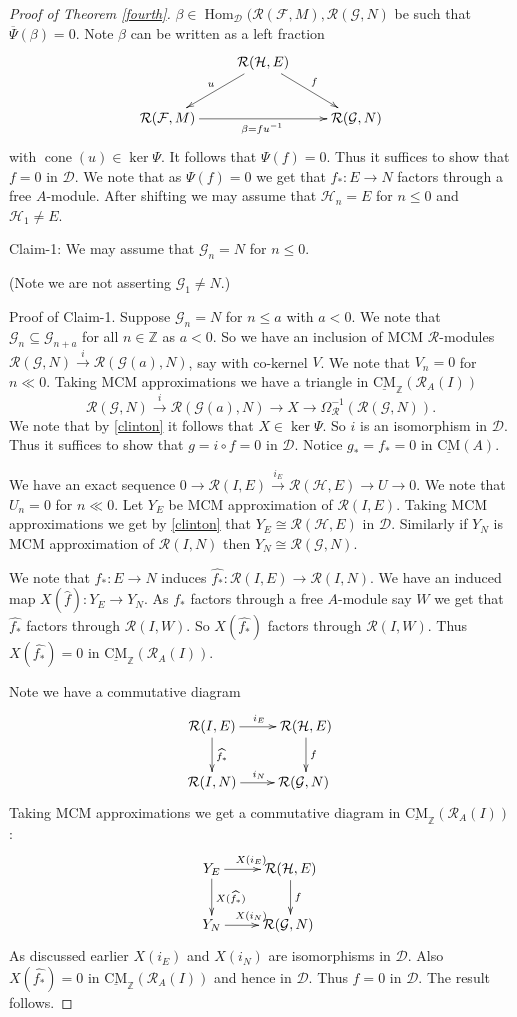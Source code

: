 \documentclass{amsart}
\newcommand{\D}{\mathcal{D} }
\newcommand{\Z}{\mathbb{Z} }
\newcommand{\eR}{\mathcal{R} }
\newcommand{\Fc}{\mathcal{F} }
\newcommand{\Hc}{\mathcal{H} }
\newcommand{\Dc}{\mathcal{D}}
\newcommand{\Gc}{\mathcal{G} }
\newcommand{\rt}{\rightarrow}
\newcommand{\ov}{\overline}
\newcommand{\wh}{\widehat }
\newcommand{\cone}{\operatorname{cone}}
\newcommand{\CMS}{\operatorname{\underline{CM}}}
\newcommand{\Hom}{\operatorname{Hom}}
\theoremstyle{plain}
\theoremstyle{definition}
\theoremstyle{remark}
\begin{document}
{\begin{proof}[Proof of Theorem \ref{fourth}]
$\beta \in \Hom_{\Dc}(\eR(\Fc, M), \eR(\Gc, N)$ be such that $\ov{\Psi}(\beta) = 0$.
Note  $\beta $ can be written as a left fraction
\[
\xymatrix{
\
&\eR(\Hc, E)
\ar@{->}[dl]_{u}
\ar@{->}[dr]^{f}
 \\
\eR(\Fc, M)
\ar@{->}[rr]_{\beta = fu^{-1}}
&\
&\eR(\Gc, N)
}
\]
with $\cone(u) \in \ker \Psi$. It follows that $\Psi(f) = 0$. Thus it suffices to show that
$f = 0$ in $\D$. We note that as $\Psi(f) = 0$ we get that $f_* \colon E \rt N$ factors through a free $A$-module.
After shifting we may assume that $\Hc_n = E$ for $n \leq 0$ and $\Hc_1 \neq E$.

Claim-1: We may assume that $\Gc_n = N$ for $n \leq 0$.

(Note we are not asserting $\Gc_1 \neq N$.)

Proof of Claim-1. Suppose $\Gc_n = N$ for $n \leq a$ with $a < 0$.
We note that $\Gc_n \subseteq \Gc_{n+a}$ for all $n \in \Z$ as $a < 0$. So we have an inclusion of MCM $\eR$-modules
$ \eR(\Gc, N) \xrightarrow{i} \eR(\Gc(a), N)$, say  with co-kernel $V$. We note that $V_n =0$ for $n \ll 0$. Taking  MCM approximations we have a triangle in  $\CMS_\Z(\eR_A(I))$
$$ \eR(\Gc, N) \xrightarrow{i}  \eR(\Gc(a), N) \rt X \rt \Omega^{-1}_{\eR}(\eR(\Gc, N)).$$
We note that by \ref{clinton} it follows that $X \in \ker \Psi$. So $i$ is an isomorphism in $\D$.
Thus it suffices to show that $g = i\circ f = 0$ in $\D$. Notice $g_* = f_* =0$ in $\CMS(A)$.


We have an exact sequence $0  \rt \eR(I, E) \xrightarrow{i_E} \eR(\Hc, E) \rt U \rt 0$. We note that $U_n = 0$ for $n \ll 0$.  Let $Y_E$ be MCM approximation of $\eR(I, E)$. Taking MCM approximations we get by \ref{clinton} that $Y_E \cong \eR(\Hc, E)$ in $\D$. Similarly if $Y_N$ is MCM approximation of $\eR(I, N)$ then $Y_N \cong \eR(\Gc, N)$.

We note that $f_* \colon E \rt N$ induces $\wh{f_*} \colon \eR(I, E) \rt \eR(I, N)$. We have an induced map $X(\wh{f}) \colon Y_E \rt Y_N$. As $f_*$ factors through a free $A$-module say $W$ we get that $\wh{f_*}$ factors through $\eR(I, W)$. So $X(\wh{f_*}) $ factors through $\eR(I, W)$. Thus $X(\wh{f_*}) = 0$ in $\CMS_\Z(\eR_A(I))$.

Note we have a commutative diagram
\[
  \xymatrix
{
 \eR(I,E)
\ar@{->}[r]^{i_E}
\ar@{->}[d]^{\wh{f_*}}
 & \eR(\Hc, E)
\ar@{->}[d]^{f}
\\
 \eR(I, N)
 \ar@{->}[r]^{i_N}
 & \eR(\Gc, N)
\
 }
\]
Taking MCM approximations we get a commutative diagram in $\CMS_\Z(\eR_A(I))$:
\[
  \xymatrix
{
 Y_E
\ar@{->}[r]^{X(i_E)}
\ar@{->}[d]^{X(\wh{f_*})}
 & \eR(\Hc, E)
\ar@{->}[d]^{f}
\\
 Y_N
 \ar@{->}[r]^{X(i_N)}
 & \eR(\Gc, N)
\
 }
\]
As discussed earlier $X(i_E)$ and $X(i_N)$ are isomorphisms in $\D$. Also $X(\wh{f_*}) = 0$ in $\CMS_\Z(\eR_A(I))$ and hence in $\D$. Thus $f = 0$ in $\D$. The result follows.
\end{proof}
}
\end{document}
